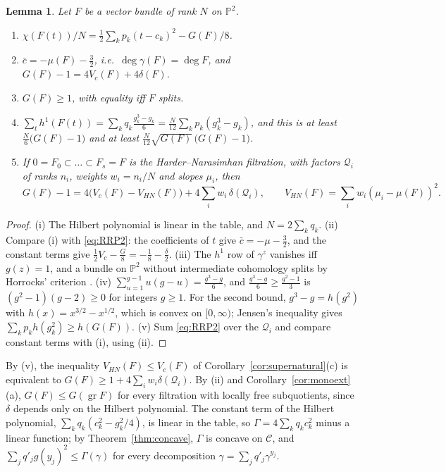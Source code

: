 \documentclass[11pt]{amsart}
\newtheorem{lemma}[theorem]{Lemma}
\theoremstyle{definition}
\theoremstyle{remark}
\newcommand{\PP}{\mathbb{P}}
\newcommand{\cQ}{\mathcal{Q}}
\newcommand{\CC}{\mathcal{C}}
\DeclareMathOperator{\gr}{gr}
\begin{document}
\begin{lemma}\label{lem:basic}
Let $F$ be a vector bundle of rank $N$ on $\PP^2$.
\begin{enumerate}[label=\textup{(\roman*)}]
\item $\chi(F(t))/N=\frac12\sum_kp_k(t-c_k)^2-G(F)/8$.
\item $\bar c=-\mu(F)-\frac32$, i.e.\ $\deg\gamma(F)=\deg F$, and $G(F)-1=4V_c(F)+4\delta(F)$.
\item $G(F)\ge1$, with equality iff $F$ splits.
\item $\sum_th^1(F(t))=\sum_kq_k\frac{g_k^3-g_k}6=\frac N{12}\sum_kp_k(g_k^3-g_k)$, and this is at least $\frac N6\big(G(F)-1\big)$ and at least $\frac N{12}\sqrt{G(F)}\,\big(G(F)-1\big)$.
\item If $0=F_0\subset\dots\subset F_s=F$ is the Harder--Narasimhan filtration, with factors $\cQ_i$ of ranks $n_i$, weights $w_i=n_i/N$ and slopes $\mu_i$, then
\[
G(F)-1=4\big(V_c(F)-V_{HN}(F)\big)+4\sum_iw_i\,\delta(\cQ_i),\qquad V_{HN}(F)=\sum_iw_i(\mu_i-\mu(F))^2 .
\]
\end{enumerate}
\end{lemma}

\begin{proof}
(i) The Hilbert polynomial is linear in the table, and $N=2\sum_kq_k$.
(ii) Compare (i) with \eqref{eq:RRP2}: the coefficients of $t$ give $\bar c=-\mu-\frac32$, and the constant terms give $\frac12V_c-\frac G8=-\frac18-\frac\delta2$.
(iii) The $h^1$ row of $\gamma^z$ vanishes iff $g(z)=1$, and a bundle on $\PP^2$ without intermediate cohomology splits by Horrocks' criterion \cite{Ho64}.
(iv) $\sum_{u=1}^{g-1}u(g-u)=\frac{g^3-g}6$, and $\frac{g^3-g}6\ge\frac{g^2-1}3$ is $(g^2-1)(g-2)\ge0$ for integers $g\ge1$. For the second bound, $g^3-g=h(g^2)$ with $h(x)=x^{3/2}-x^{1/2}$, which is convex on $[0,\infty)$; Jensen's inequality gives $\sum_kp_kh(g_k^2)\ge h(G(F))$.
(v) Sum \eqref{eq:RRP2} over the $\cQ_i$ and compare constant terms with (i), using (ii).
\end{proof}

By (v), the inequality $V_{HN}(F)\le V_c(F)$ of Corollary~\ref{cor:supernatural}(c) is equivalent to $G(F)\ge1+4\sum_iw_i\delta(\cQ_i)$. By (ii) and Corollary~\ref{cor:monoext}(a), $G(F)\le G(\gr F)$ for every filtration with locally free subquotients, since $\delta$ depends only on the Hilbert polynomial. The constant term of the Hilbert polynomial, $\sum_kq_k(c_k^2-g_k^2/4)$, is linear in the table, so $\Gamma=4\sum_kq_kc_k^2$ minus a linear function; by Theorem~\ref{thm:concave}, $\Gamma$ is concave on $\CC$, and $\sum_jq'_jg(y_j)^2\le\Gamma(\gamma)$ for every decomposition $\gamma=\sum_jq'_j\gamma^{y_j}$.
\end{document}
